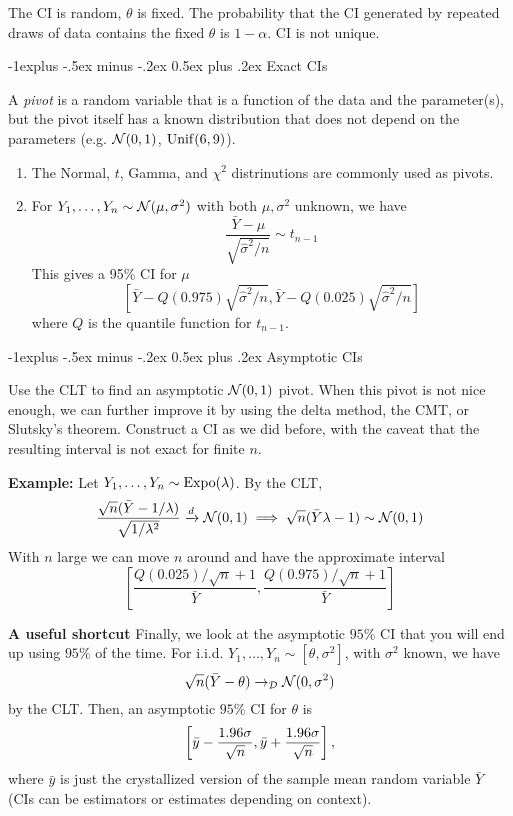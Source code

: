 \documentclass[10pt,landscape]{article}
\makeatletter
\renewcommand{\subsection}{\@startsection{subsection}{2}{0mm}%
                                {-1explus -.5ex minus -.2ex}%
                                {0.5ex plus .2ex}%
                                {\normalfont\normalsize\bfseries}}
\makeatother
\begin{document}
\begin{multicols*}{3}
The CI is random, $\theta$ is fixed. The probability that the CI generated by repeated draws of data contains the fixed $\theta$ is $1-\alpha$. CI is not unique.


\subsection{Exact CIs}

A \emph{pivot} is a random variable that is a function of the data and the parameter(s), but the pivot itself has a known distribution that does not depend on the parameters (e.g. $\mathcal{N}(0,1)$, $\operatorname{Unif}(6,9)$).
\begin{enumerate}
    \item The Normal, $t$, Gamma, and $\chi^2$ distrinutions are commonly used as pivots.
    \item For $Y_1,\ldots,Y_n\sim\mathcal{N}(\mu,\sigma^2)$ with both $\mu,\sigma^2$ unknown, we have
    $$
    \frac{\bar Y-\mu}{\sqrt{\hat\sigma^2/n}}\sim t_{n-1}
    $$
    This gives a 95\% CI for $\mu$
    $$
    [\bar Y-Q(0.975)\sqrt{\hat\sigma^2/n},\bar Y-Q(0.025)\sqrt{\hat\sigma^2/n}]
    $$
    where $Q$ is the quantile function for $t_{n-1}$.
\end{enumerate}
\subsection{Asymptotic CIs}

Use the CLT to find an asymptotic $\mathcal{N}(0,1)$ pivot. When this pivot is not nice enough, we can further improve it by using the delta method, the CMT, or Slutsky's theorem. Construct a CI as we did before, with the caveat that the resulting interval is not exact for finite $n$.

\textbf{Example:} Let $Y_1,\ldots,Y_n\sim \operatorname{Expo}(\lambda)$. By the CLT,
$$
\frac{\sqrt{n}(\bar Y-1/\lambda)}{\sqrt{1/\lambda^2}}\xrightarrow{d}\mathcal{N}(0,1)\implies \sqrt{n}(\bar Y\lambda-1)\sim\mathcal{N}(0,1)
$$
With $n$ large we can move $n$ around and have the approximate interval
$$
\left[\frac{Q(0.025)/\sqrt{n}+1}{\bar Y},\frac{Q(0.975)/\sqrt{n}+1}{\bar Y}\right]
$$

\textbf{A useful shortcut}
Finally, we look at the asymptotic $95\%$ CI that you will end up using $95\%$ of the time. For i.i.d. $Y_1,\dots,Y_n\sim [\theta,\sigma^2]$, with $\sigma^2$ known, we have $$\sqrt{n}(\bar{Y}-\theta)\to_\mathcal{D}\mathcal{N}(0,\sigma^2)$$ by the CLT. Then, an asymptotic $95\%$ CI for $\theta$ is $$\left[ \bar{y}-\frac{1.96\sigma}{\sqrt{n}},\bar{y}+\frac{1.96\sigma}{\sqrt{n}} \right],$$ where $\bar{y}$ is just the crystallized version of the sample mean random variable $\bar{Y}$ (CIs can be estimators or estimates depending on context).


\end{multicols*}
\end{document}
